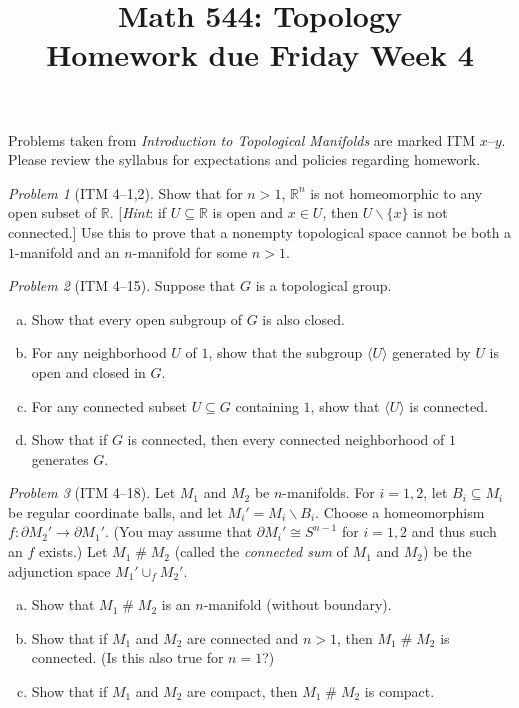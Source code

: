 \documentclass[11pt,twoside]{amsart}
\title{Math 544: Topology\\ Homework due Friday Week 4}
\theoremstyle{plain}
\theoremstyle{remark}
\newtheorem{prob}{Problem}
\theoremstyle{definition}
\theoremstyle{definition}
\newcommand{\RR}{\mathbb{R}}
\newcommand{\cs}{\mathbin{\#}}
\begin{document}
\maketitle

\noindent Problems taken from \emph{Introduction to Topological Manifolds} are marked ITM $x$--$y$. Please review the syllabus for expectations and policies regarding homework.

\begin{prob}[ITM 4--1,2]
Show that for $n>1$, $\RR^n$ is not homeomorphic to any open subset of $\RR$. [\emph{Hint}: if $U\subseteq \RR$ is open and $x\in U$, then $U\smallsetminus \{x\}$ is not connected.] Use this to prove that a nonempty topological space cannot be both a $1$-manifold and an $n$-manifold for some $n>1$.
\end{prob}

\begin{prob}[ITM 4--15]
Suppose that $G$ is a topological group.
\begin{enumerate}[(a)]
\item Show that every open subgroup of $G$ is also closed.
\item For any neighborhood $U$ of $1$, show that the subgroup $\langle U\rangle$ generated by $U$ is open and closed in $G$.
\item For any connected subset $U\subseteq G$ containing $1$, show that $\langle U\rangle$ is connected.
\item Show that if $G$ is connected, then every connected neighborhood of $1$ generates $G$.
\end{enumerate}
\end{prob}

\begin{prob}[ITM 4--18]
Let $M_1$ and $M_2$ be $n$-manifolds. For $i=1,2$, let $B_i\subseteq M_i$ be regular coordinate balls, and let $M_i' = M_i\smallsetminus B_i$. Choose a homeomorphism $f\colon \partial M_2'\to \partial M_1'$. (You may assume that $\partial M_i'\cong S^{n-1}$ for $i=1,2$ and thus such an $f$ exists.) Let $M_1 \cs M_2$ (called the \emph{connected sum} of $M_1$ and $M_2$) be the adjunction space $M_1'\cup_f M_2'$.
\begin{enumerate}[(a)]
\item Show that $M_1\cs M_2$ is an $n$-manifold (without boundary).
\item Show that if $M_1$ and $M_2$ are connected and $n>1$, then $M_1\cs M_2$ is connected. (Is this also true for $n=1$?)
\item Show that if $M_1$ and $M_2$ are compact, then $M_1\cs M_2$ is compact.
\end{enumerate}
\end{prob}
\end{document}
